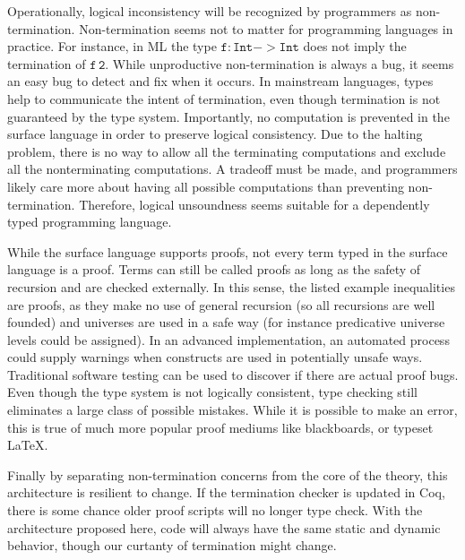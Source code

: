 Operationally, logical inconsistency will be recognized by programmers as non-termination.
Non-termination seems not to matter for programming languages in practice.
For instance, in ML the type $\mathtt{f:Int->Int}$ does not imply the termination of $\mathtt{f\,2}$.
While unproductive non-termination is always a bug, it seems an easy bug to detect and fix when it occurs.
In mainstream languages, types help to communicate the intent of termination, even though termination is not guaranteed by the type system.
Importantly, no computation is prevented in the surface language in order to preserve logical consistency.
Due to the halting problem, there is no way to allow all the terminating computations and exclude all the nonterminating computations.
A tradeoff must be made, and programmers likely care more about having all possible computations than preventing non-termination.
Therefore, logical unsoundness seems suitable for a dependently typed programming language.
 
 
 
While the surface language supports proofs, not every term typed in the surface language is a proof.
Terms can still be called proofs as long as the safety of recursion and \tit{} are checked externally.
In this sense, the listed example inequalities are proofs, as they make no use of general recursion (so all recursions are well founded) and universes are used in a safe way (for instance predicative universe levels could be assigned).
In an advanced implementation, an automated process could supply warnings when constructs are used in potentially unsafe ways.
Traditional software testing can be used to discover if there are actual proof bugs.
Even though the type system is not logically consistent, type checking still eliminates a large class of possible mistakes.
While it is possible to make an error, this is true of much more popular proof mediums like blackboards, or typeset \LaTeX.
 
Finally by separating non-termination concerns from the core of the theory, this architecture is resilient to change.
If the termination checker is updated in Coq, there is some chance older proof scripts will no longer type check.
With the architecture proposed here, code will always have the same static and dynamic behavior, though our curtanty of termination might change.
 
